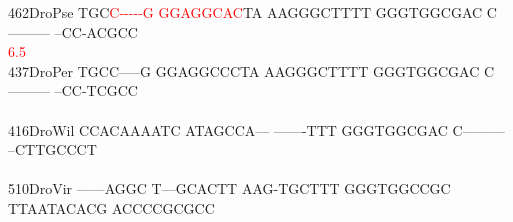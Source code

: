 \documentclass[11pt,twoside,reqno,a4paper]{article}
\begin{document}
{462\hspace*{1\charwidth}DroPse	TGC\textcolor{Red}{C}\textcolor{Red}{-}\textcolor{Red}{-}\textcolor{Red}{-}\textcolor{Red}{-}\textcolor{Red}{-}\textcolor{Red}{G}	\textcolor{Red}{G}\textcolor{Red}{G}\textcolor{Red}{A}\textcolor{Red}{G}\textcolor{Red}{G}\textcolor{Red}{C}\textcolor{Red}{A}\textcolor{Red}{C}TA	AAGGGCTTTT	GGGTGGCGAC	C---------	--CC-ACGCC	\\
\hspace*{4\charwidth}\hspace*{7\charwidth}\hspace*{3\charwidth}\textcolor{Red}{6.5}\hspace*{1\charwidth}\hspace*{1\charwidth}\hspace*{1\charwidth}\hspace*{1\charwidth}\hspace*{1\charwidth}\hspace*{1\charwidth}\\
437\hspace*{1\charwidth}DroPer	TGCC-----G	GGAGGCCCTA	AAGGGCTTTT	GGGTGGCGAC	C---------	--CC-TCGCC	\\
\hspace*{4\charwidth}\hspace*{7\charwidth}\hspace*{1\charwidth}\hspace*{1\charwidth}\hspace*{1\charwidth}\hspace*{1\charwidth}\hspace*{1\charwidth}\hspace*{1\charwidth}\\
416\hspace*{1\charwidth}DroWil	CCACAAAATC	ATAGCCA---	-------TTT	GGGTGGCGAC	C---------	--CTTGCCCT	\\
\hspace*{4\charwidth}\hspace*{7\charwidth}\hspace*{1\charwidth}\hspace*{1\charwidth}\hspace*{1\charwidth}\hspace*{1\charwidth}\hspace*{1\charwidth}\hspace*{1\charwidth}\\
510\hspace*{1\charwidth}DroVir	------AGGC	T---GCACTT	AAG-TGCTTT	GGGTGGCCGC	TTAATACACG	ACCCCGCGCC	\\
}
\end{document}
